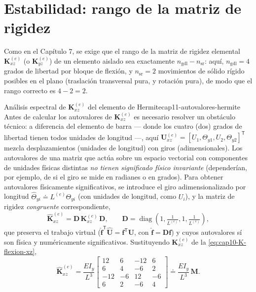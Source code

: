 \section{Estabilidad: rango de la matriz de rigidez}
\label{sec:cap11-estabilidad}

Como en el Capítulo 7, se exige que el rango de la matriz de rigidez elemental $\bm K^{(e)}_{xz}$ (o $\bm K^{(e)}_{yz}$) de un elemento aislado sea exactamente $n_{\text{gdl}}-n_{\text{sr}}$: aquí, $n_{\text{gdl}}=4$ grados de libertad por bloque de flexión, y $n_{\text{sr}}=2$ movimientos de sólido rígido posibles en el plano (traslación transversal pura, y rotación pura), de modo que el rango correcto es $4-2=2$.

\begin{ejemplo}{Análisis espectral de \texorpdfstring{$\bm K^{(e)}_{xz}$}{K\_xz} del elemento de Hermite}{cap11-autovalores-hermite}
Antes de calcular los autovalores de $\bm K^{(e)}_{xz}$ es necesario resolver un obstáculo técnico: a diferencia del elemento de barra --- donde los cuatro (dos) grados de libertad tienen todos unidades de longitud ---, aquí $\bm U^{(e)}_{xz}=[U_1,\Theta_{y1},U_2,\Theta_{y2}]^{\mathsf T}$ mezcla desplazamientos (unidades de longitud) con giros (adimensionales). Los autovalores de una matriz que actúa sobre un espacio vectorial con componentes de unidades físicas distintas \emph{no tienen significado físico invariante} (dependerían, por ejemplo, de si el giro se mide en radianes o en grados). Para obtener autovalores físicamente significativos, se introduce el giro adimensionalizado por longitud $\hat\Theta_{yi}\doteq L^{(e)}\Theta_{yi}$ (con unidades de longitud, como $U_i$), y la matriz de rigidez \emph{congruente} correspondiente,
\[
\hat{\bm K}^{(e)}_{xz} = \bm D\,\bm K^{(e)}_{xz}\,\bm D, \qquad \bm D=\operatorname{diag}\!\left(1,\tfrac1{L^{(e)}},1,\tfrac1{L^{(e)}}\right) ,
\]
que preserva el trabajo virtual ($\hat{\bm f}^{\mathsf T}\hat{\bm U}=\bm f^{\mathsf T}\bm U$, con $\hat{\bm f}=\bm D\bm f$) y cuyos autovalores sí son física y numéricamente significativos. Sustituyendo $\bm K^{(e)}_{xz}$ de la \cref{eq:cap10-K-flexion-xz},
\[
\hat{\bm K}^{(e)}_{xz} = \frac{EI_y}{L^3}
\begin{bmatrix}
12 & 6 & -12 & 6 \\
6 & 4 & -6 & 2 \\
-12 & -6 & 12 & -6 \\
6 & 2 & -6 & 4
\end{bmatrix} \doteq \frac{EI_y}{L^3}\,\bm M .
\]


\end{ejemplo}
